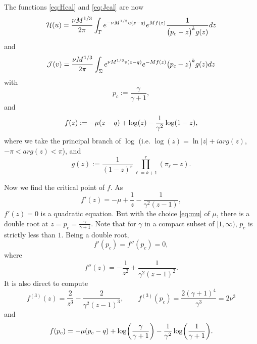 \documentclass[11pt]{article}
\begin{document}
The functions \eqref{eq:Hcal} and \eqref{eq:Jcal} are now
\begin{equation}\label{eq:H1}
  \mathcal{H}(u)
  = \frac{\nu M^{1/3}}{2\pi}
  \int_\Gamma e^{-\nu M^{1/3} u(z-q)} e^{Mf(z)}
  \frac1{\bigl(p_c-z\bigr)^kg(z)} dz
\end{equation}
and
\begin{equation}\label{eq:J1}
  \mathcal{J}(v) = \frac{\nu M^{1/3}}{2\pi} \int_\Sigma
  e^{\nu M^{1/3} v(z-q)} e^{-Mf(z)}
  \bigl(p_c-z\bigr)^kg(z) dz
\end{equation}
with
\begin{equation}
  p_c := \frac{\gamma}{\gamma+1},
\end{equation}
and
\begin{equation}\label{eq:f}
   f(z) := -\mu (z-q) +\log(z) - \frac1{\gamma^2}\log(1-z),
\end{equation}
where we take the principal branch of $\log$ (i.e. $\log(z)= \ln |z|+i
arg(z)$, $-\pi<arg(z)<\pi$), and
\begin{equation}\label{eq:g}
  g(z) := \frac{1}{(1-z)^{r}}
  \prod_{\ell=k+1}^r (\pi_\ell-z).
\end{equation}

Now we find the critical point of $f$. As
\begin{equation}
  f'(z) = -\mu + \frac{1}{z} -\frac1{\gamma^2(z-1)},
\end{equation}
$f'(z)=0$ is a quadratic equation. But with the choice
\eqref{eq:mu} of $\mu$, there is a double root at
$z=p_c=\frac{\gamma}{\gamma+1}$. Note that for $\gamma$ in a
compact subset of $[1,\infty)$, $p_c$ is strictly less than $1$.
Being a double root,
\begin{equation}
  f'(p_c)=f''(p_c)=0,
\end{equation}
where
\begin{equation}
  f''(z) = - \frac{1}{z^2} + \frac1{\gamma^2(z-1)^2}.
\end{equation}
It is also direct to compute
\begin{equation}\label{eq:fthreep}
  f^{(3)}(z) = \frac{2}{z^3} - \frac{2}{\gamma^2(z-1)^3},
  \qquad f^{(3)}(p_c) = \frac{2(\gamma+1)^4}{\gamma^3} = 2\nu^3
\end{equation}
and
\begin{equation}
  f(p_c) = -\mu(p_c-q) +
  \log\biggl(\frac{\gamma}{\gamma+1}\biggr) -
  \frac1{\gamma^2} \log\biggl( \frac1{\gamma+1} \biggr).
\end{equation}
\end{document}
